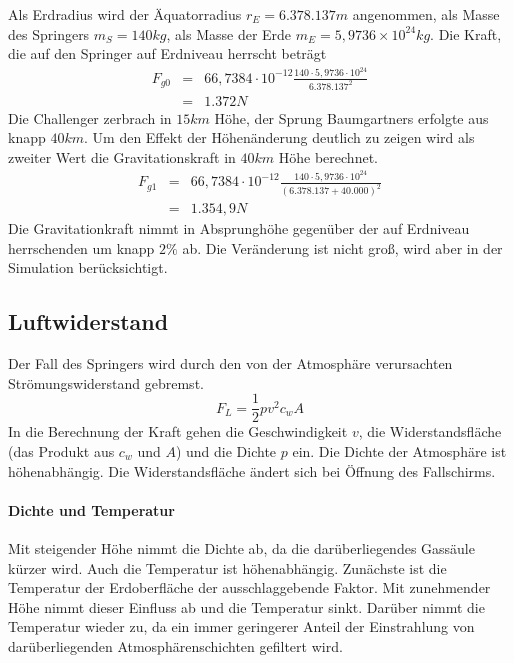 Als Erdradius wird der Äquatorradius $r_E=6.378.137m$ angenommen, als Masse des Springers $m_S=140kg$, als Masse der Erde $m_E=5,9736\times 10^{24}kg$.
Die Kraft, die auf den Springer auf Erdniveau herrscht beträgt
\begin{eqnarray}
F_{g0} &=& 66,7384\cdot 10^{-12} \frac{140\cdot 5,9736\cdot 10^{24}}{6.378.137^2} \\
 &=& 1.372 N \nonumber
\end{eqnarray}
Die Challenger zerbrach in $15km$ Höhe, der Sprung Baumgartners erfolgte aus knapp $40km$.
Um den Effekt der Höhenänderung deutlich zu zeigen wird als zweiter Wert die Gravitationskraft in $40km$ Höhe berechnet.
\begin{eqnarray}
F_{g1} &=& 66,7384\cdot 10^{-12} \frac{140\cdot 5,9736\cdot 10^{24}}{\left(6.378.137 + 40.000\right)^2} \\
 &=& 1.354,9 N \nonumber
\end{eqnarray}
Die Gravitationkraft nimmt in Absprunghöhe gegenüber der auf Erdniveau herrschenden um knapp $2\%$ ab.
Die Veränderung ist nicht groß, wird aber in der Simulation berücksichtigt.

\subsection{Luftwiderstand}
Der Fall des Springers wird durch den von der Atmosphäre verursachten Strömungswiderstand gebremst.
\begin{equation}
F_L=\frac{1}{2}pv^2c_wA
\end{equation}
In die Berechnung der Kraft gehen die Geschwindigkeit $v$, die Widerstandsfläche (das Produkt aus $c_w$ und $A$) und die Dichte $p$ ein.
Die Dichte der Atmosphäre ist höhenabhängig.
Die Widerstandsfläche ändert sich bei Öffnung des Fallschirms.



\paragraph{Dichte und Temperatur}
Mit steigender Höhe nimmt die Dichte ab, da die darüberliegendes Gassäule kürzer wird.
Auch die Temperatur ist höhenabhängig.
Zunächste ist die Temperatur der Erdoberfläche der ausschlaggebende Faktor.
Mit zunehmender Höhe nimmt dieser Einfluss ab und die Temperatur sinkt.
Darüber nimmt die Temperatur wieder zu, da ein immer geringerer Anteil der Einstrahlung von darüberliegenden Atmosphärenschichten gefiltert wird.

